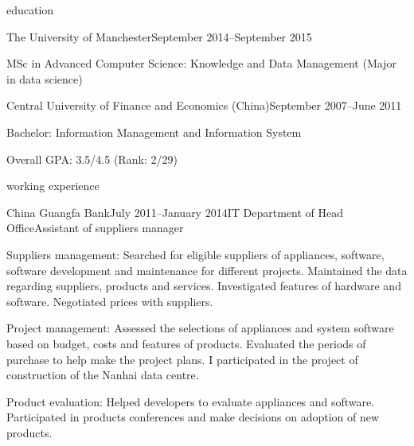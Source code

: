 \documentclass{resume} %
\begin{document}

\begin{rSection}{education}

\begin{rSubsection}{The University of Manchester}{September 2014--September 2015}{}{}
    \item MSc in Advanced Computer Science: Knowledge and Data Management (Major in data science)
\end{rSubsection}

\begin{rSubsection}{Central University of Finance and Economics (China)}{September 2007--June 2011}{}{}
    \item Bachelor: Information Management and Information System
    \item Overall GPA: 3.5/4.5 (Rank: 2/29)
\end{rSubsection}

\end{rSection}


\begin{rSection}{working experience}

\begin{rSubsection}{China Guangfa Bank}{July 2011--January 2014}{IT Department of Head Office}{Assistant of suppliers manager}
    \item Suppliers management:
    Searched for eligible suppliers of appliances, software, software development and maintenance for different projects. Maintained the data regarding suppliers, products and services.
    Investigated features of hardware and software.
    Negotiated prices with suppliers.
    \item Project management:
    Assessed the selections of appliances and system software based on budget, costs and features of products. Evaluated the periods of purchase to help make the project plans.
    I participated in the project of construction of the Nanhai data centre.
    \item Product evaluation:
    Helped developers to evaluate appliances and software. Participated in products conferences and make decisions on adoption of new products.
\end{rSubsection}

\end{rSection}
\end{document}
